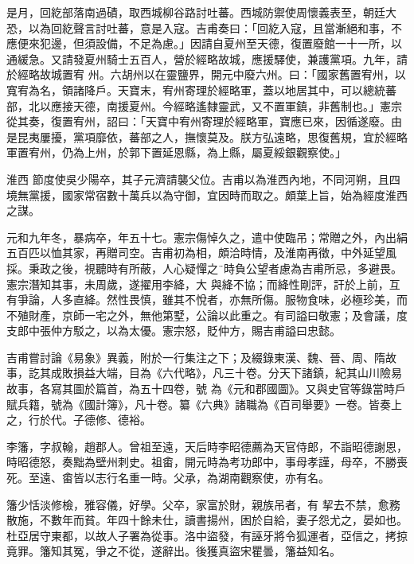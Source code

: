 \begin{pinyinscope}
 是月，回紇部落南過磧，取西城柳谷路討吐蕃。西城防禦使周懷義表至，朝廷大恐，以為回紇聲言討吐蕃，意是入寇。吉甫奏曰：「回紇入寇，且當漸絕和事，不應便來犯邊，但須設備，不足為慮。」因請自夏州至天德，復置廢館一十一所，以通緩急。又請發夏州騎士五百人，營於經略故城，應援驛使，兼護黨項。九年，請於經略故城置宥
 州。六胡州以在靈鹽界，開元中廢六州。曰：「國家舊置宥州，以寬宥為名，領諸降戶。天寶末，宥州寄理於經略軍，蓋以地居其中，可以總統蕃部，北以應接天德，南援夏州。今經略遙隸靈武，又不置軍鎮，非舊制也。」憲宗從其奏，復置宥州，詔曰：「天寶中宥州寄理於經略軍，寶應已來，因循遂廢。由是昆夷屢擾，黨項靡依，蕃部之人，撫懷莫及。朕方弘遠略，思復舊規，宜於經略軍置宥州，仍為上州，於郭下置延恩縣，為上縣，屬夏綏銀觀察使。」



 淮西
 節度使吳少陽卒，其子元濟請襲父位。吉甫以為淮西內地，不同河朔，且四境無黨援，國家常宿數十萬兵以為守御，宜因時而取之。頗葉上旨，始為經度淮西之謀。



 元和九年冬，暴病卒，年五十七。憲宗傷悼久之，遣中使臨吊；常贈之外，內出絹五百匹以恤其家，再贈司空。吉甫初為相，頗洽時情，及淮南再徵，中外延望風採。秉政之後，視聽時有所蔽，人心疑憚之¨時負公望者慮為吉甫所忌，多避畏。憲宗潛知其事，未周歲，遂擢用李絳，大
 與絳不協；而絳性剛評，訐於上前，互有爭論，人多直絳。然性畏慎，雖其不悅者，亦無所傷。服物食味，必極珍美，而不殖財產，京師一宅之外，無他第墅，公論以此重之。有司謚曰敬憲；及會議，度支郎中張仲方駁之，以為太優。憲宗怒，貶仲方，賜吉甫謚曰忠懿。



 吉甫嘗討論《易象》異義，附於一行集注之下；及綴錄東漢、魏、晉、周、隋故事，訖其成敗損益大端，目為《六代略》，凡三十卷。分天下諸鎮，紀其山川險易故事，各寫其圖於篇首，為五十四卷，號
 為《元和郡國圖》。又與史官等錄當時戶賦兵籍，號為《國計簿》，凡十卷。纂《六典》諸職為《百司舉要》一卷。皆奏上之，行於代。子德修、德裕。



 李籓，字叔翰，趙郡人。曾祖至遠，天后時李昭德薦為天官侍郎，不詣昭德謝恩，時昭德怒，奏黜為壁州刺史。祖畬，開元時為考功郎中，事母孝謹，母卒，不勝喪死。至遠、畬皆以志行名重一時。父承，為湖南觀察使，亦有名。



 籓少恬淡修檢，雅容儀，好學。父卒，家富於財，親族吊者，有
 挈去不禁，愈務散施，不數年而貧。年四十餘未仕，讀書揚州，困於自給，妻子怨尤之，晏如也。杜亞居守東都，以故人子署為從事。洛中盜發，有誣牙將令狐運者，亞信之，拷掠竟罪。籓知其冤，爭之不從，遂辭出。後獲真盜宋瞿曇，籓益知名。




\end{pinyinscope}
